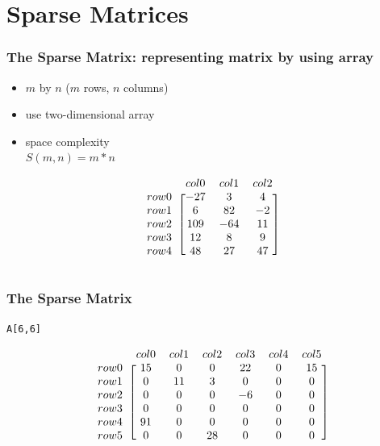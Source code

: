 \documentclass[newPxFont,sthlmFooter,nooffset]{beamer}
\begin{document}
\section{Sparse Matrices}

\begin{frame}[t, fragile]
  \frametitle{The Sparse Matrix: {\large representing matrix by using array}}
  \begin{itemize}
  \item $m$ by $n$ ($m$ rows, $n$ columns)
  \item use two-dimensional array
  \item space complexity \\
        $S(m, n) = m *n$
  \end{itemize}

\begin{equation*}
  \begin{blockarray}{r *{3}{c}}
      & col0 & col1 & col2 \\
\begin{block}{l [*{3}{c}]}
 row0 & -27  &   3  &  4   \\
 row1 &   6  &  82  &  -2  \\
 row2 & 109  & -64  &  11   \\
 row3 &  12  &   8  &  9   \\
 row4 &  48  &  27  & 47   \\
\end{block}
  \end{blockarray}
\end{equation*}
\end{frame}

\begin{frame}[t, fragile]
  \frametitle{The Sparse Matrix}
\texttt{A[6,6]}

\begin{equation*}
  \begin{blockarray}{r *{6}{c}}
      & col0 & col1 & col2 & col3 & col4 & col5 \\
\begin{block}{l [*{6}{c}]}
 row0 & 15  & 0   & 0  &  22 &   0 &   15   \\
 row1 & 0   & 11  & 3  &   0 &   0 &   0   \\
 row2 & 0   & 0   & 0  &  -6 &   0 &   0   \\
 row3 & 0   & 0   & 0  &   0 &   0 &   0   \\
 row4 & 91  & 0   & 0  &   0 &   0 &   0   \\
 row5 & 0   & 0   & 28 &   0 &   0 &   0   \\
\end{block}
  \end{blockarray}
\end{equation*}
\end{frame}
\end{document}
